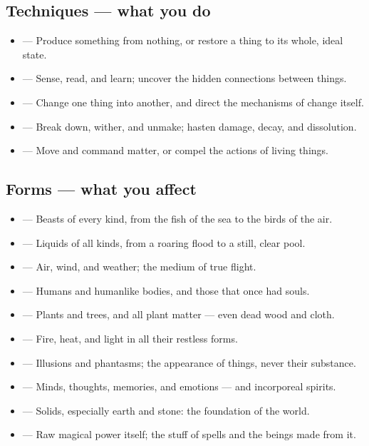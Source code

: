 \subsection*{Techniques --- what you do}
\begin{itemize}
  \item {} --- Produce something from nothing, or restore a thing to its whole, ideal state.
  \item {} --- Sense, read, and learn; uncover the hidden connections between things.
  \item {} --- Change one thing into another, and direct the mechanisms of change itself.
  \item {} --- Break down, wither, and unmake; hasten damage, decay, and dissolution.
  \item {} --- Move and command matter, or compel the actions of living things.
\end{itemize}

\subsection*{Forms --- what you affect}
\begin{itemize}
  \item {} --- Beasts of every kind, from the fish of the sea to the birds of the air.
  \item {} --- Liquids of all kinds, from a roaring flood to a still, clear pool.
  \item {} --- Air, wind, and weather; the medium of true flight.
  \item {} --- Humans and humanlike bodies, and those that once had souls.
  \item {} --- Plants and trees, and all plant matter --- even dead wood and cloth.
  \item {} --- Fire, heat, and light in all their restless forms.
  \item {} --- Illusions and phantasms; the appearance of things, never their substance.
  \item {} --- Minds, thoughts, memories, and emotions --- and incorporeal spirits.
  \item {} --- Solids, especially earth and stone: the foundation of the world.
  \item {} --- Raw magical power itself; the stuff of spells and the beings made from it.
\end{itemize}

